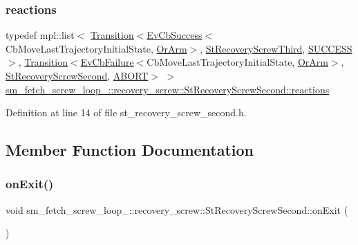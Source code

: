 \subsubsection{\texorpdfstring{reactions}{reactions}}
{\footnotesize\ttfamily typedef mpl\+::list$<$ \hyperlink{classsmacc_1_1Transition}{Transition}$<$\hyperlink{structsmacc_1_1EvCbSuccess}{Ev\+Cb\+Success}$<$Cb\+Move\+Last\+Trajectory\+Initial\+State, \hyperlink{classsm__fetch__screw__loop__1_1_1OrArm}{Or\+Arm}$>$, \hyperlink{structsm__fetch__screw__loop__1_1_1recovery__screw_1_1StRecoveryScrewThird}{St\+Recovery\+Screw\+Third}, \hyperlink{structsmacc_1_1default__transition__tags_1_1SUCCESS}{S\+U\+C\+C\+E\+SS}$>$, \hyperlink{classsmacc_1_1Transition}{Transition}$<$\hyperlink{structsmacc_1_1EvCbFailure}{Ev\+Cb\+Failure}$<$Cb\+Move\+Last\+Trajectory\+Initial\+State, \hyperlink{classsm__fetch__screw__loop__1_1_1OrArm}{Or\+Arm}$>$, \hyperlink{structsm__fetch__screw__loop__1_1_1recovery__screw_1_1StRecoveryScrewSecond}{St\+Recovery\+Screw\+Second}, \hyperlink{structsmacc_1_1default__transition__tags_1_1ABORT}{A\+B\+O\+RT}$>$ $>$ \hyperlink{structsm__fetch__screw__loop__1_1_1recovery__screw_1_1StRecoveryScrewSecond_a0bb8f2ceef64dabc619299ff033e97e3}{sm\+\_\+fetch\+\_\+screw\+\_\+loop\+\_\+::recovery\+\_\+screw\+::\+St\+Recovery\+Screw\+Second\+::reactions}}



Definition at line 14 of file st\+\_\+recovery\+\_\+screw\+\_\+second.\+h.



\subsection{Member Function Documentation}
\mbox{\label{structsm__fetch__screw__loop__1_1_1recovery__screw_1_1StRecoveryScrewSecond_a349192be4c035e3792e5e3c97e63e590}} 
\subsubsection{\texorpdfstring{on\+Exit()}{onExit()}}
{\footnotesize\ttfamily void sm\+\_\+fetch\+\_\+screw\+\_\+loop\+\_\+::recovery\+\_\+screw\+::\+St\+Recovery\+Screw\+Second\+::on\+Exit (\begin{DoxyParamCaption}{ }\end{DoxyParamCaption})\hspace{0.3cm}{\ttfamily [inline]}}



